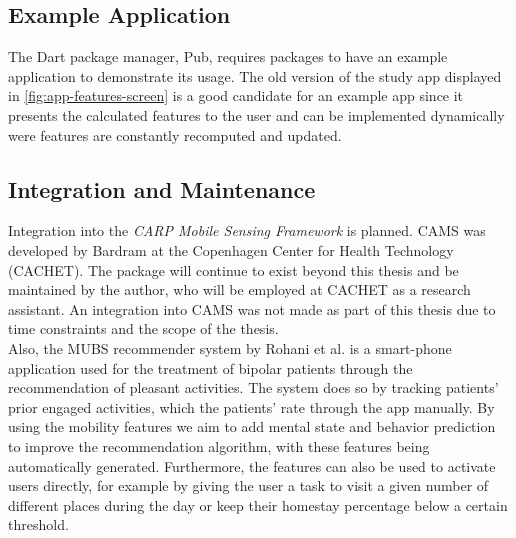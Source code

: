 \subsection{Example Application}
The Dart package manager, Pub, requires packages to have an example application to demonstrate its usage. The old version of the study app displayed in \ref{fig:app-features-screen} is a good candidate for an example app since it presents the calculated features to the user and can be implemented dynamically were features are constantly recomputed and updated.

\subsection{Integration and Maintenance}
Integration into the \textit{CARP Mobile Sensing Framework} is planned. CAMS was developed by Bardram \cite{CAMS} at the Copenhagen Center for Health Technology (CACHET). The package will continue to exist beyond this thesis and be maintained by the author, who will be employed at CACHET as a research assistant. An integration into CAMS was not made as part of this thesis due to time constraints and the scope of the thesis. \\

Also, the MUBS recommender system by Rohani et al. \cite{mubs-rohani} is a smart-phone application used for the treatment of bipolar patients through the recommendation of pleasant activities. The system does so by tracking patients' prior engaged activities, which the patients' rate through the app manually. By using the mobility features we aim to add mental state and behavior prediction to improve the recommendation algorithm, with these features being automatically generated. Furthermore, the features can also be used to activate users directly, for example by giving the user a task to visit a given number of different places during the day or keep their homestay percentage below a certain threshold.